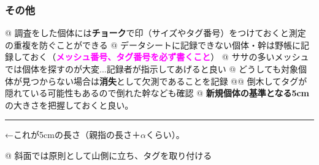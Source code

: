 \documentclass[12pt,a4paper]{extarticle}
\newcommand{\point}[1]
{\textbf{\textcolor{magenta}{#1}}}
\begin{document}
\subsubsection*{その他}

\begin{easylist}[itemize]
@ 調査をした個体には\textbf{チョーク}で印（サイズやタグ番号）をつけておくと測定の重複を防ぐことができる
@ データシートに記録できない個体・幹は野帳に記録しておく（\point{メッシュ番号、タグ番号を必ず書くこと}）
@ ササの多いメッシュでは個体を探すのが大変...記録者が指示してあげると良い
@ どうしても対象個体が見つからない場合は\textbf{消失}として欠測であることを記録
@@ 倒木してタグが隠れている可能性もあるので倒れた幹なども確認
@ \textbf{新規個体の基準となる5cm}の大きさを把握しておくと良い。

\rule{5.2cm}{1.4pt}←これが5cmの長さ（親指の長さ＋$\alpha$くらい）。

@ 斜面では原則として山側に立ち、タグを取り付ける
\end{easylist}
\end{document}
